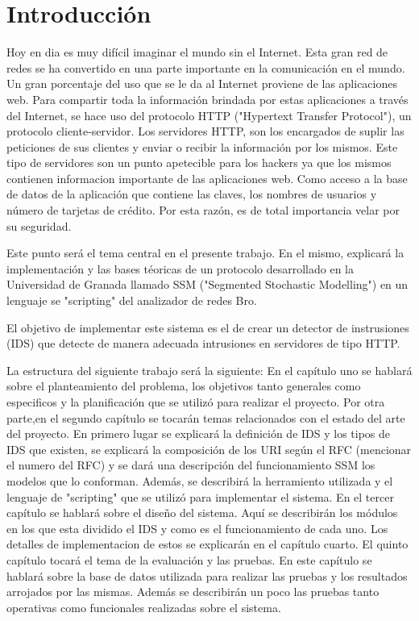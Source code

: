\chapter*{Introducción}
\label{intro}


Hoy en dia es muy difícil imaginar el mundo sin el Internet. Esta gran red de
redes se ha convertido en una parte importante en la comunicación en el mundo.
Un gran porcentaje del uso que se le da al Internet proviene de las aplicaciones
web. Para compartir toda la información brindada por estas aplicaciones a través del Internet, se hace uso del protocolo HTTP ("Hypertext Transfer Protocol"), un protocolo cliente-servidor. Los servidores HTTP, son los encargados de suplir las peticiones de sus clientes y enviar o recibir la información por los mismos.
Este tipo de servidores son un punto apetecible para los hackers ya que los
mismos contienen informacion importante de las aplicaciones web. Como acceso a
la base de datos de la aplicación que contiene las claves, los nombres de usuarios
y número de tarjetas de crédito. Por esta razón, es de total importancia velar por su seguridad.

Este punto será el tema central en el presente trabajo. En el
mismo, explicará la implementación y las bases téoricas de un protocolo desarrollado en
la Universidad de Granada llamado SSM ("Segmented Stochastic Modelling") en un
lenguaje se "scripting" del analizador de redes Bro.

El objetivo de implementar este sistema es el de crear un detector de instrusiones
(IDS) que detecte de manera adecuada intrusiones en servidores de tipo
HTTP.

La estructura del siguiente trabajo será la siguiente:
En el capítulo uno se hablará sobre el planteamiento del problema,
los objetivos tanto generales como especificos y la planificación que se utilizó para
realizar el proyecto.
Por otra parte,en el segundo capítulo se tocarán temas relacionados con el
estado del arte del proyecto. En primero lugar se explicará la definición de IDS y
los tipos de IDS que existen, se explicará la composición de los URI según el RFC
(mencionar el numero del RFC) y se dará una descripción del funcionamiento SSM
los modelos que lo conforman. Además, se describirá la herramiento utilizada
y el lenguaje de "scripting" que se utilizó para implementar el sistema.
En el tercer capítulo se hablará sobre el diseño del sistema. Aquí se describirán
los módulos en los que esta dividido el IDS y como es el funcionamiento de cada
uno. Los detalles de implementacion de estos se explicarán en el capítulo cuarto.
El quinto capítulo tocará el tema de la evaluación y las pruebas. En este capítulo
se hablará sobre la base de datos utilizada para realizar las pruebas y los
resultados arrojados por las mismas. Además se describirán un poco las pruebas
tanto operativas como funcionales realizadas sobre el sistema.







